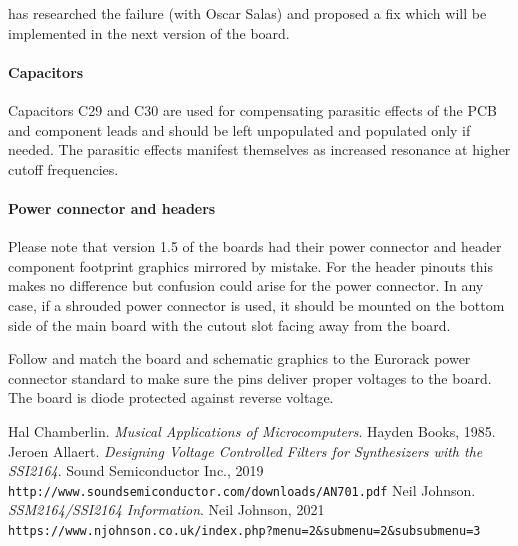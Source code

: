 \documentclass{article}
\begin{document}
\begin{flushleft}
\cite{johnson} has researched the failure (with Oscar Salas) and proposed a fix which will be implemented in the next version of the board.
\end{flushleft}

\paragraph{Capacitors}
\begin{flushleft}
Capacitors C29 and C30 are used for compensating parasitic effects of the PCB and component leads and should be left unpopulated and populated only if needed. The parasitic effects manifest themselves as increased resonance at higher cutoff frequencies.
\end{flushleft}

\paragraph{Power connector and headers}
\begin{flushleft}
Please note that version 1.5 of the boards had their power connector and header component footprint graphics mirrored by mistake. For the header pinouts this makes no difference but confusion could arise for the power connector. In any case, if a shrouded power connector is used, it should be mounted on the bottom side of the main board with the cutout slot facing away from the board.
\end{flushleft}
\begin{flushleft}
Follow and match the board and schematic graphics to the Eurorack power connector standard to make sure the pins deliver proper voltages to the board. The board is diode protected against reverse voltage.
\end{flushleft}

\begin{thebibliography}{9}
Hal Chamberlin.
\textit{Musical Applications of Microcomputers}.
Hayden Books, 1985.
Jeroen Allaert.
\textit{Designing Voltage Controlled Filters for Synthesizers with the SSI2164}.
Sound Semiconductor Inc., 2019
\\\texttt{http://www.soundsemiconductor.com/downloads/AN701.pdf}
Neil Johnson.
\textit{SSM2164/SSI2164 Information}.
Neil Johnson, 2021
\\\texttt{https://www.njohnson.co.uk/index.php?menu=2\&submenu=2\&subsubmenu=3}
\end{thebibliography}
\end{document}
